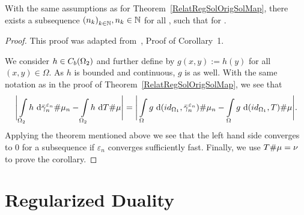 \begin{corollary}\label{RelatRegOrigCor}
	With the same assumptions as for Theorem~\ref{RelatRegSolOrigSolMap}, there exists a subsequence ${(n_k)}_{\NinN[k]}, \NinN[n_k]$ for all \NinN[k], such that  for \Ninf.
\end{corollary}

\begin{proof}
	This proof was adapted from~\cite{Seg2018}, Proof of Corollary~1.

	We consider $h \in \CF[b]{\Omega_2}$ and further define \map[g]{\Omega}{\R} by $g(x, y) := h(y)$ for all $(x, y) \in \Omega$. As $h$ is bounded and continuous, $g$ is as well. With the same notation as in the proof of Theorem~\ref{RelatRegSolOrigSolMap}, we see that
	\[ \Bigg\lvert \int\limits_{\Omega_2} h~\D[{\push[\bar{\gamma}_n^{\varepsilon_n}]{\mu_n}}] - \int\limits_{\Omega_2} h~\D[{\push{\mu}}] \Bigg\rvert = \Bigg\lvert \int\limits_{\Omega} g~\D[{\push[(id_{\Omega_1}, \bar{\gamma}_n^{\varepsilon_n})]{\mu_n}}] - \int\limits_{\Omega} g~\D[{\push[(id_{\Omega_1}, T)]{\mu}}] \Bigg\rvert. \]
	Applying the theorem mentioned above we see that the left hand side converges to $0$ for a subsequence if $\varepsilon_n$ converges sufficiently fast. Finally, we use $\push{\mu} = \nu$ to prove the corollary.
\end{proof}

\section{Regularized Duality}\label{RegDual}

